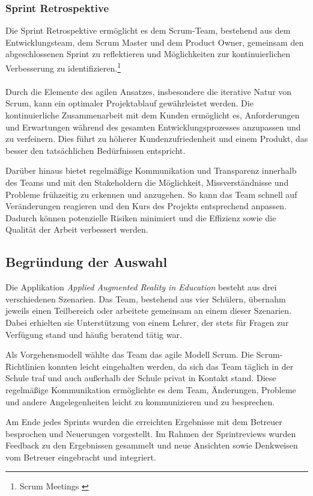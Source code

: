 \subsubsection*{Sprint Retrospektive}
Die Sprint Retrospektive ermöglicht es dem Scrum-Team, bestehend aus dem Entwicklungsteam, dem Scrum Master und dem Product
Owner, gemeinsam den abgeschlossenen Sprint zu reflektieren und Möglichkeiten zur kontinuierlichen Verbesserung zu
identifizieren.\footnote{Scrum Meetings \cite{Sprint Retroperspektiv}}
\\
\\

Durch die Elemente des agilen Ansatzes, insbesondere die iterative Natur von Scrum, kann ein optimaler Projektablauf
gewährleistet werden. Die kontinuierliche Zusammenarbeit mit dem Kunden ermöglicht es, Anforderungen und Erwartungen
während des gesamten Entwicklungsprozesses anzupassen und zu verfeinern. Dies führt zu höherer Kundenzufriedenheit und
einem Produkt, das besser den tatsächlichen Bedürfnissen entspricht.

Darüber hinaus bietet regelmäßige Kommunikation und Transparenz innerhalb des Teams und mit den Stakeholdern die Möglichkeit,
Missverständnisse und Probleme frühzeitig zu erkennen und anzugehen. So kann das Team schnell auf Veränderungen reagieren
und den Kurs des Projekts entsprechend anpassen. Dadurch können potenzielle Risiken minimiert und die Effizienz sowie
die Qualität der Arbeit verbessert werden.

\subsection{Begründung der Auswahl}
Die Applikation \textit{Applied Augmented Reality in Education} besteht aus drei verschiedenen Szenarien. Das Team,
bestehend aus vier Schülern, übernahm jeweils einen Teilbereich oder arbeitete gemeinsam an einem dieser Szenarien. Dabei
erhielten sie Unterstützung von einem Lehrer, der stets für Fragen zur Verfügung stand und häufig beratend tätig war.

Als Vorgehensmodell wählte das Team das agile Modell Scrum. Die Scrum-Richtlinien konnten leicht eingehalten werden, da
sich das Team täglich in der Schule traf und auch außerhalb der Schule privat in Kontakt stand. Diese regelmäßige Kommunikation
ermöglichte es dem Team, Änderungen, Probleme und andere Angelegenheiten leicht zu kommunizieren und zu besprechen.

Am Ende jedes Sprints wurden die erreichten Ergebnisse mit dem Betreuer besprochen und Neuerungen vorgestellt. Im Rahmen
der Sprintreviews wurden Feedback zu den Ergebnissen gesammelt und neue Ansichten sowie Denkweisen vom Betreuer eingebracht
und integriert.

